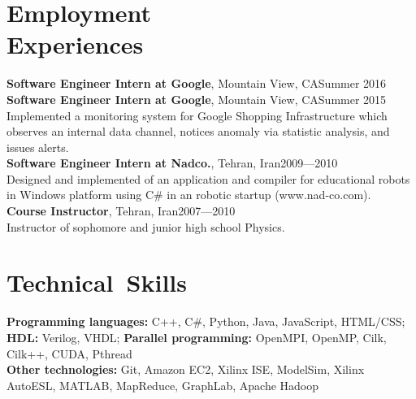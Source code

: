 \documentclass[overlapped]{res}
\begin{document}

\address{ECE - MS-366, Rice University\\
 P.O. Box 1892\\
 Houston, TX 77251-1892\\
 (832)-538-8848
}
\address{
 \href{mailto:ebrahim@rice.edu}{ebrahim(at)rice.edu}\\
 \href{mailto:e.songhori@gmail.com }{e.songhori(at)gmail.com }\\
 \href{https://github.com/esonghori}{https://github.com/esonghori}
}

\begin{resume}

\section{Employment\\ Experiences}
{\bf Software Engineer Intern at Google}, Mountain View, CA\hfill Summer 2016\\
{\bf Software Engineer Intern at Google}, Mountain View, CA\hfill Summer 2015\\
Implemented a monitoring system for Google Shopping Infrastructure which observes an internal data channel, notices anomaly via statistic analysis, and issues alerts.\\
{\bf Software Engineer Intern at Nadco.}, Tehran, Iran\hfill 2009---2010\\
Designed and implemented of an application and compiler for educational robots in Windows platform using C\# in an robotic startup (www.nad-co.com).\\
{\bf Course Instructor}, Tehran, Iran\hfill 2007---2010\\
Instructor of sophomore and junior high school Physics.\\

\section{Technical\ Skills}
{\bf Programming languages:} C++, C\#, Python, Java, JavaScript, HTML/CSS; {\bf HDL:} Verilog, VHDL; {\bf Parallel programming:} OpenMPI, OpenMP, Cilk, Cilk++, CUDA, Pthread\\
{\bf Other technologies:} Git, Amazon EC2, Xilinx ISE, ModelSim, Xilinx AutoESL, MATLAB, MapReduce, GraphLab, Apache Hadoop\\


\end{resume}
\end{document}
